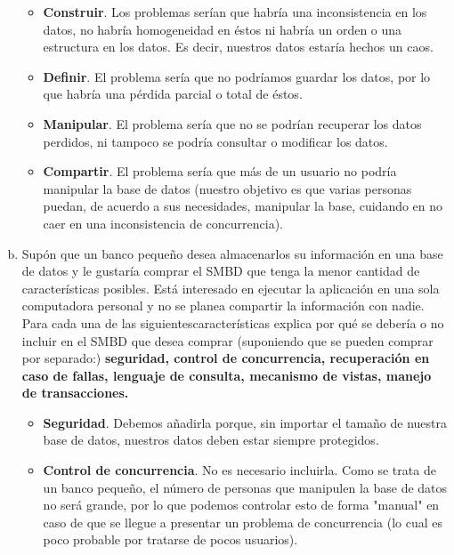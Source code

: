 \documentclass[letterpaper,12pt]{article}
\begin{document}
\begin{enumerate}[a. ]
	\begin{itemize}

		\item \textbf{Construir}. Los problemas serían que habría una inconsistencia en los datos, no habría homogeneidad en éstos ni habría un orden o una estructura en los datos. Es decir, nuestros datos estaría hechos un caos. 
		\item \textbf{Definir}. El problema sería que no podríamos guardar los datos, por lo que habría una pérdida parcial o total de éstos.
		\item \textbf{Manipular}. El problema sería que no se podrían recuperar los datos perdidos, ni tampoco se podría consultar o modificar los datos. 

		\item \textbf{Compartir}. El problema sería que  más de un usuario no podría manipular la base de datos (nuestro objetivo es que varias personas puedan, de acuerdo a sus necesidades, manipular la base, cuidando en no caer en una inconsistencia de concurrencia).

	\end{itemize}


            \item Supón que un banco pequeño desea almacenarlos su información en una base de datos y le gustaría comprar el SMBD que tenga la menor cantidad de características posibles. Está interesado en ejecutar la aplicación en una sola computadora personal y no se planea compartir la información con nadie. Para cada una de las siguientescaracterísticas explica por qué se debería o no incluir en el SMBD que desea comprar (suponiendo que se pueden comprar por separado:) \textbf{seguridad, control de concurrencia, recuperación en caso de fallas, lenguaje de consulta, mecanismo de vistas, manejo de transacciones.} \\

	\begin{itemize}
	
		\item \textbf{Seguridad}. Debemos añadirla porque, sin importar el tamaño de nuestra base de datos, nuestros datos deben estar siempre protegidos. 

		\item \textbf{Control de concurrencia}. No es necesario incluirla. Como se trata de un banco pequeño, el número de personas que manipulen la base de datos no será grande, por lo que podemos controlar esto de forma "manual" en caso de que se llegue a presentar un problema de concurrencia (lo cual es poco probable por tratarse de pocos usuarios).


\end{itemize}
\end{enumerate}
\end{document}
